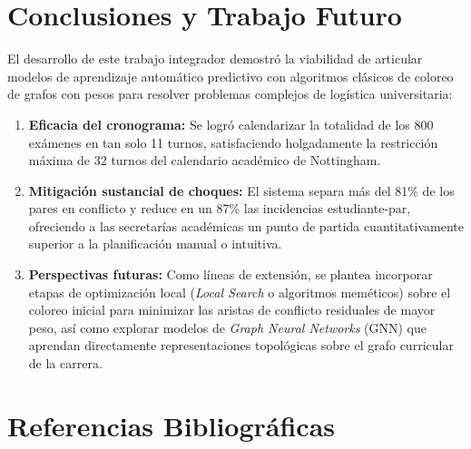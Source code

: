 \documentclass[11pt,a4paper]{article}
\begin{document}
\section{Conclusiones y Trabajo Futuro}

El desarrollo de este trabajo integrador demostró la viabilidad de articular modelos de aprendizaje automático predictivo con algoritmos clásicos de coloreo de grafos con pesos para resolver problemas complejos de logística universitaria:
\begin{enumerate}
    \item \textbf{Eficacia del cronograma:} Se logró calendarizar la totalidad de los 800 exámenes en tan solo 11 turnos, satisfaciendo holgadamente la restricción máxima de 32 turnos del calendario académico de Nottingham.
    \item \textbf{Mitigación sustancial de choques:} El sistema separa más del 81\% de los pares en conflicto y reduce en un 87\% las incidencias estudiante-par, ofreciendo a las secretarías académicas un punto de partida cuantitativamente superior a la planificación manual o intuitiva.
    \item \textbf{Perspectivas futuras:} Como líneas de extensión, se plantea incorporar etapas de optimización local (\textit{Local Search} o algoritmos meméticos) sobre el coloreo inicial para minimizar las aristas de conflicto residuales de mayor peso, así como explorar modelos de \textit{Graph Neural Networks} (GNN) que aprendan directamente representaciones topológicas sobre el grafo curricular de la carrera.
\end{enumerate}

\section*{Referencias Bibliográficas}
\end{document}
